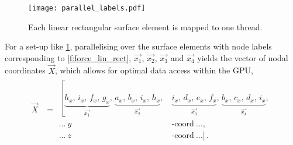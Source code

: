 \begin{figure}
  \centering
  \texttt{[image: parallel\_labels.pdf]}
  \caption[Linear rectangular surface element mapping.]{Each linear rectangular surface element is mapped to one thread.}
  \label{f:paraLabel}
\end{figure}
For a set-up like \cref{f:paraLabel}, parallelising over the surface elements with node labels corresponding to \cref{f:force_lin_rect}, $\vec{x_1}$, $\vec{x_2}$, $\vec{x_3}$ and $\vec{x_4}$ yields the vector of nodal coordinates $\vec{X}$, which allows for optimal data access within the GPU,
\begin{align}\label{eq:fcne_eg}
  \vec{X} & = \begin{aligned}
    \left[\underbrace{h_{x},\, i_{x},\, f_{x},\, g_{x}}_{\vec{x_{1}}},\,
    \underbrace{a_{x},\, b_{x},\, i_{x},\, h_{x}}_{\vec{x_{2}}},\,
    \right.  & \underbrace{i_{x},\, d_{x},\, e_{x},\, f_{x}}_{\vec{x_{3}}},\,
    \underbrace{b_{x},\, c_{x},\, d_{x},\, i_{x}}_{\vec{x_{4}}},              \\
    \ldots~y & \textrm{-coord}~\ldots,                                        \\
    \ldots~z & \textrm{-coord}~\ldots]\,.
  \end{aligned}
\end{align}

